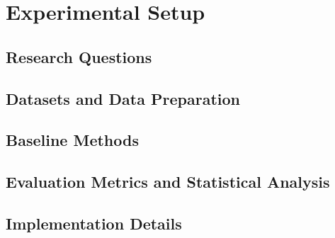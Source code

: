 \newpage

\section{Experimental Setup}
\label{sec:05_experimental_setup}

\subsection{Research Questions}

\subsection{Datasets and Data Preparation}

\subsection{Baseline Methods}

\subsection{Evaluation Metrics and Statistical Analysis}

\subsection{Implementation Details}

